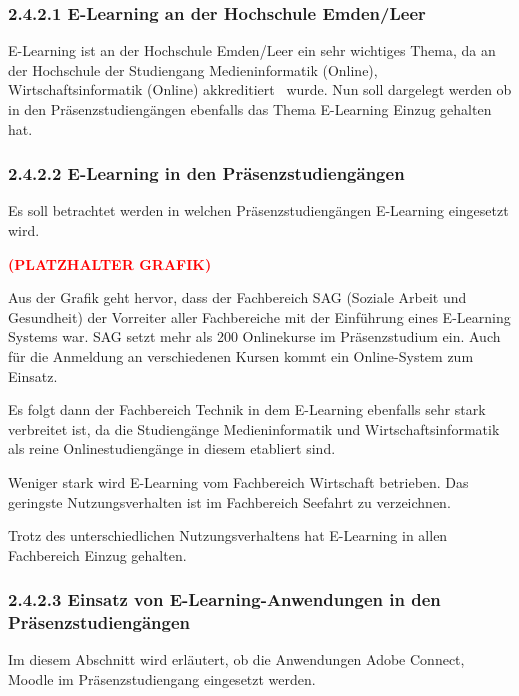 \documentclass[a4paper]{article}
\newcommand\textstyleAbsatzStandardschriftart[1]{#1}
\begin{document}
\subsubsection[2.4.2.1 E{}-Learning an der Hochschule Emden/Leer]{2.4.2.1 E-Learning an der Hochschule Emden/Leer}
{\sffamily\color{black}
E-Learning ist an der Hochschule Emden/Leer ein sehr wichtiges Thema, da an der Hochschule der Studiengang
Medieninformatik (Online), Wirtschaftsinformatik (Online) akkreditiert \ wurde. Nun soll dargelegt werden ob in den
Präsenzstudiengängen ebenfalls das Thema E-Learning Einzug gehalten hat.}

\subsubsection{2.4.2.2 E-Learning in den Präsenzstudiengängen}
{\sffamily\mdseries\color{black}
Es soll betrachtet werden in welchen Präsenzstudiengängen E-Learning eingesetzt wird.}


\bigskip

{\centering\sffamily\color{black}
\textstyleAbsatzStandardschriftart{\textbf{\textcolor{red}{(PLATZHALTER GRAFIK)}}}
\par}


\bigskip

{\sffamily\mdseries\color{black}
Aus der Grafik geht hervor, dass der Fachbereich SAG (Soziale Arbeit und Gesundheit) der Vorreiter aller Fachbereiche
mit der Einführung eines E-Learning Systems war. SAG setzt mehr als 200 Onlinekurse im Präsenzstudium ein. Auch für die
Anmeldung an verschiedenen Kursen kommt ein Online-System zum Einsatz.}


\bigskip

{\sffamily\mdseries\color{black}
\textstyleAbsatzStandardschriftart{Es folgt dann der Fachbereich Technik in dem E-Learning ebenfalls sehr stark
verbreitet ist, da die Studiengänge Medieninformatik und Wirtschaftsinformatik als reine Onlinestudiengänge in diesem
etabliert sind.}}


\bigskip

{\sffamily\mdseries\color{black}
Weniger stark wird E-Learning vom Fachbereich Wirtschaft betrieben. Das geringste Nutzungsverhalten ist im Fachbereich
Seefahrt zu verzeichnen.}


\bigskip

{\sffamily\color{black}
Trotz des unterschiedlichen Nutzungsverhaltens hat E-Learning in allen Fachbereich Einzug gehalten.}

\subsubsection{2.4.2.3 Einsatz von E-Learning-Anwendungen in den Präsenzstudiengängen}
{\sffamily\mdseries\color{black}
Im diesem Abschnitt wird erläutert, ob die Anwendungen Adobe Connect, Moodle im Präsenzstudiengang eingesetzt werden.}
\end{document}
